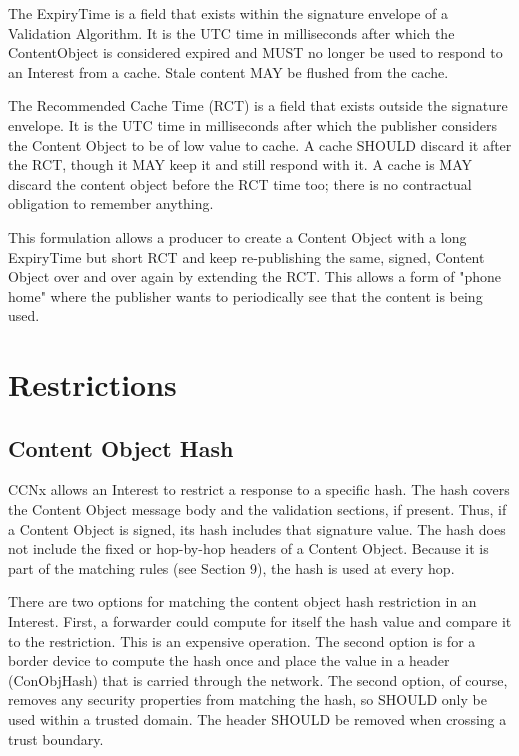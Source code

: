 \documentclass[12pt]{article}
\begin{document}
The ExpiryTime is a field that exists within the signature envelope
of a Validation Algorithm.  It is the UTC time in milliseconds after
which the ContentObject is considered expired and MUST no longer be
used to respond to an Interest from a cache.  Stale content MAY be
flushed from the cache.

The Recommended Cache Time (RCT) is a field that exists outside the
signature envelope.  It is the UTC time in milliseconds after which
the publisher considers the Content Object to be of low value to
cache.  A cache SHOULD discard it after the RCT, though it MAY keep
it and still respond with it.  A cache is MAY discard the content
object before the RCT time too; there is no contractual obligation to
remember anything.

This formulation allows a producer to create a Content Object with a
long ExpiryTime but short RCT and keep re-publishing the same,
signed, Content Object over and over again by extending the RCT.
This allows a form of "phone home" where the publisher wants to
periodically see that the content is being used.

\section{Restrictions}

\subsection{Content Object Hash}
CCNx allows an Interest to restrict a response to a specific hash.
The hash covers the Content Object message body and the validation
sections, if present.  Thus, if a Content Object is signed, its hash
includes that signature value.  The hash does not include the fixed
or hop-by-hop headers of a Content Object.  Because it is part of the
matching rules (see Section 9), the hash is used at every hop.

There are two options for matching the content object hash
restriction in an Interest.  First, a forwarder could compute for
itself the hash value and compare it to the restriction.  This is an
expensive operation.  The second option is for a border device to
compute the hash once and place the value in a header (ConObjHash)
that is carried through the network.  The second option, of course,
removes any security properties from matching the hash, so SHOULD
only be used within a trusted domain.  The header SHOULD be removed
when crossing a trust boundary.
\end{document}
